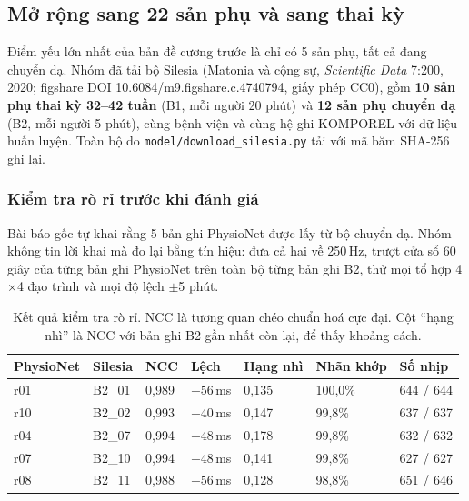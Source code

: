 \subsection{Mở rộng sang 22 sản phụ và sang thai kỳ}
\label{sec:silesia}

Điểm yếu lớn nhất của bản đề cương trước là chỉ có 5 sản phụ, tất cả đang chuyển dạ. Nhóm đã tải bộ
Silesia (Matonia và cộng sự, \textit{Scientific Data} 7:200, 2020; figshare DOI 10.6084/m9.figshare.c.4740794,
giấy phép CC0), gồm \textbf{10 sản phụ thai kỳ 32--42 tuần} (B1, mỗi người 20 phút) và \textbf{12 sản phụ chuyển
dạ} (B2, mỗi người 5 phút), cùng bệnh viện và cùng hệ ghi KOMPOREL với dữ liệu huấn luyện. Toàn bộ do
\texttt{model/download\_silesia.py} tải với mã băm SHA-256 ghi lại.

\subsubsection{Kiểm tra rò rỉ trước khi đánh giá}

Bài báo gốc tự khai rằng 5 bản ghi PhysioNet được lấy từ bộ chuyển dạ. Nhóm không tin lời khai mà đo lại
bằng tín hiệu: đưa cả hai về 250\,Hz, trượt cửa sổ 60 giây của từng bản ghi PhysioNet trên toàn bộ từng
bản ghi B2, thử mọi tổ hợp 4$\times$4 đạo trình và mọi độ lệch $\pm$5 phút.

\begin{table}[H]\centering\small
\caption{Kết quả kiểm tra rò rỉ. NCC là tương quan chéo chuẩn hoá cực đại. Cột ``hạng nhì'' là NCC với
bản ghi B2 gần nhất còn lại, để thấy khoảng cách.}
\label{tab:roriSilesia}
\begin{tabular}{@{}C{1.6cm} C{1.6cm} C{1.6cm} C{2.0cm} C{1.8cm} C{2.2cm} C{2.2cm}@{}}
\toprule
\textbf{PhysioNet} & \textbf{Silesia} & \textbf{NCC} & \textbf{Lệch} & \textbf{Hạng nhì} &
\textbf{Nhãn khớp} & \textbf{Số nhịp} \\
\midrule
r01 & B2\_01 & 0,989 & $-56$\,ms & 0,135 & 100,0\% & 644 / 644 \\
r10 & B2\_02 & 0,993 & $-40$\,ms & 0,147 & 99,8\% & 637 / 637 \\
r04 & B2\_07 & 0,994 & $-48$\,ms & 0,178 & 99,8\% & 632 / 632 \\
r07 & B2\_10 & 0,994 & $-48$\,ms & 0,141 & 99,8\% & 627 / 627 \\
r08 & B2\_11 & 0,988 & $-56$\,ms & 0,128 & 98,8\% & 651 / 646 \\
\bottomrule
\end{tabular}
\end{table}

